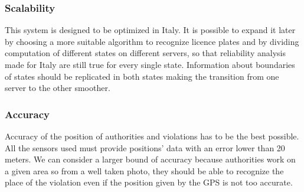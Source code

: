 \subsubsection{Scalability}
This system is designed to be optimized in Italy. It is possible to expand it later by choosing a more suitable
algorithm to recognize licence plates and by dividing computation of different states on different servers, so that reliability analysis made for Italy are still true for every single state. Information about boundaries
of states should be replicated in both states making the transition from one server to the other smoother.
\subsubsection{Accuracy}
Accuracy of the position of authorities and violations has to be the best possible. All the sensors used must provide positions' data with an error lower than 20 meters. We can consider a larger bound of accuracy because authorities work on a given area so from a well taken photo, they should be able to recognize the place of the violation even if the position given by the GPS is not too accurate.










